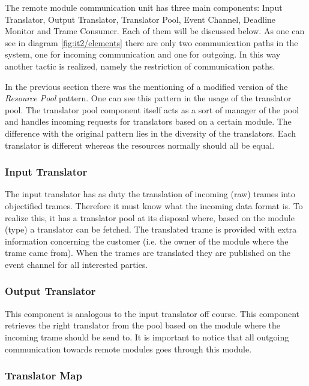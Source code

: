 \npar The remote module communication unit has three main components: Input
Translator, Output Translator, Translator Pool, Event Channel, Deadline Monitor
and Trame Consumer. Each of them will be discussed below. As one can see in
diagram \ref{fig:it2/elements} there are only two communication paths
in the system, one for incoming communication and one for outgoing. In this way
another tactic is realized, namely the restriction of communication paths.

\npar In the previous section there was the mentioning of a modified version of
the \emph{Resource Pool} pattern. One can see this pattern in the usage of the
translator pool. The translator pool component itself acts as a sort of manager
of the pool and handles incoming requests for translators based on a
certain module. The difference with the original pattern lies in the 
diversity of the translators. Each translator is different whereas the
resources normally should all be equal. 

\subsubsection{Input Translator}

\npar The input translator has as duty the translation of incoming (raw) trames
into objectified trames. Therefore it must know what the incoming data format
is. To realize this, it has a translator pool at its disposal where, based on
the module (type) a translator can be fetched. The translated trame is provided
with extra information concerning the customer (i.e. the owner of the module where the
trame came from). When the trames are translated they are published on the event
channel for all interested parties.

\subsubsection{Output Translator}

\npar This component is analogous to the input translator off course. This
component retrieves the right translator from the pool based on the module
where the incoming trame should be send to. It is important to notice that all
outgoing communication towards remote modules goes through this module.

\subsubsection{Translator Map}

